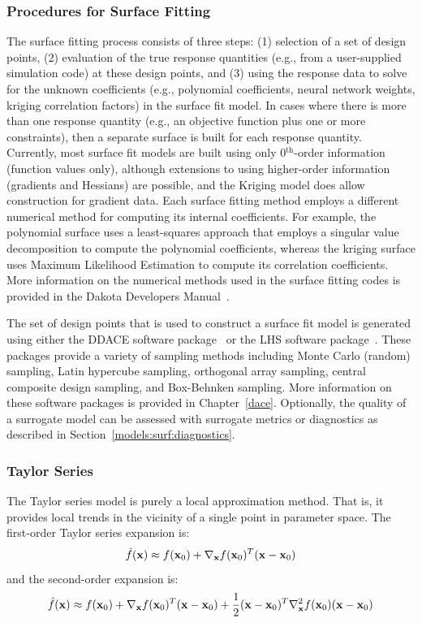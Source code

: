\subsubsection{Procedures for Surface Fitting}\label{models:surf:procedures}

The surface fitting process consists of three steps: (1) selection of
a set of design points, (2) evaluation of the true response quantities
(e.g., from a user-supplied simulation code) at these design points,
and (3) using the response data to solve for the unknown coefficients
(e.g., polynomial coefficients, neural network weights, kriging
correlation factors) in the surface fit model. In cases where there is
more than one response quantity (e.g., an objective function plus one
or more constraints), then a separate surface is built for each
response quantity. Currently, most surface fit models are built using
only 0$^{\mathrm{th}}$-order information (function values only),
although extensions to using higher-order information (gradients and
Hessians) are possible, and the Kriging model does allow construction
for gradient data. Each surface fitting method employs a different
numerical method for computing its internal coefficients. For example,
the polynomial surface uses a least-squares approach that employs a
singular value decomposition to compute the polynomial coefficients,
whereas the kriging surface uses Maximum Likelihood Estimation to
compute its correlation coefficients. More information on the
numerical methods used in the surface fitting codes is provided in the
Dakota Developers Manual~\cite{DevMan}.

The set of design points that is used to construct a surface fit model
is generated using either the DDACE software package~\cite{TonXX} or
the LHS software package~\cite{Ima84}. These packages provide a
variety of sampling methods including Monte Carlo (random) sampling,
Latin hypercube sampling, orthogonal array sampling, central composite
design sampling, and Box-Behnken sampling. More information on these
software packages is provided in Chapter~\ref{dace}.  Optionally, the
quality of a surrogate model can be assessed with surrogate metrics or
diagnostics as described in Section~\ref{models:surf:diagnostics}.

\subsubsection{Taylor Series}\label{models:surf:taylor}

The Taylor series model is purely a local approximation method. That
is, it provides local trends in the vicinity of a single point in
parameter space. The first-order Taylor series expansion is:
\begin{equation}
\hat{f}({\bf x}) \approx f({\bf x}_0) + \nabla_{\bf x} f({\bf x}_0)^T 
({\bf x} - {\bf x}_0) \label{eq:taylor1}
\end{equation}
and the second-order expansion is:
\begin{equation}
\hat{f}({\bf x}) \approx f({\bf x}_0) + \nabla_{\bf x} f({\bf x}_0)^T 
({\bf x} - {\bf x}_0) + \frac{1}{2} ({\bf x} - {\bf x}_0)^T 
\nabla^2_{\bf x} f({\bf x}_0) ({\bf x} - {\bf x}_0) \label{eq:taylor2}
\end{equation}

